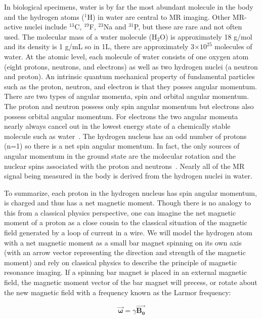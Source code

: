 In biological specimens, water is by far the most abundant molecule in the body and the hydrogen atoms ($^{1}$H) in water are central to MR imaging.
Other MR-active nuclei include $^{13}$C, $^{19}$F, $^{23}$Na and $^{31}$P, but these are rare and not often used.
The molecular mass of a water molecule (H$_2$O) is approximately 18 g/mol and its density is 1 g/mL so in 1L, there are approximately 3$\times10^{25}$ molecules of water.
At the atomic level, each molecule of water consists of one oxygen atom (eight protons, neutrons, and electrons) as well as two hydrogen nuclei (a neutron and proton).
An intrinsic quantum mechanical property of fundamental particles such as the proton, neutron, and electron is that they posses angular momentum.
There are two types of angular momenta, spin and orbital angular momentum.
The proton and neutron possess only spin angular momentum but electrons also possess orbital angular momentum.
For electrons the two angular momenta nearly always cancel out in the lowest energy state of a chemically stable molecule such as water~\cite{Levitt:2001wo}.
The hydrogen nucleus has an odd number of protons (n=1) so there is a net spin angular momentum.
In fact, the only sources of angular momentum in the ground state are the molecular rotation and the nuclear spins associated with the proton and neutrons~\cite{Levitt:2001wo}.
Nearly all of the MR signal being measured in the body is derived from the hydrogen nuclei in water.

To summarize, each proton in the hydrogen nucleus has spin angular momentum, is charged and thus has a net magnetic moment.
Though there is no analogy to this from a classical physics perspective, one can imagine the net magnetic moment of a proton as a close cousin to the classical situation of the magnetic field generated by a loop of current in a wire.
We will model the hydrogen atom with a net magnetic moment as a small bar magnet spinning on its own axis (with an arrow vector representing the direction and strength of the magnetic moment) and rely on classical physics to describe the principle of magnetic resonance imaging. 
If a spinning bar magnet is placed in an external magnetic field, the magnetic moment vector of the bar magnet will precess, or rotate about the new magnetic field with a frequency known as the Larmor frequency:

\begin{equation}
	\vec{\mathbf{\omega}} = \gamma \vec{\mathbf{B_0}}
\end{equation}

